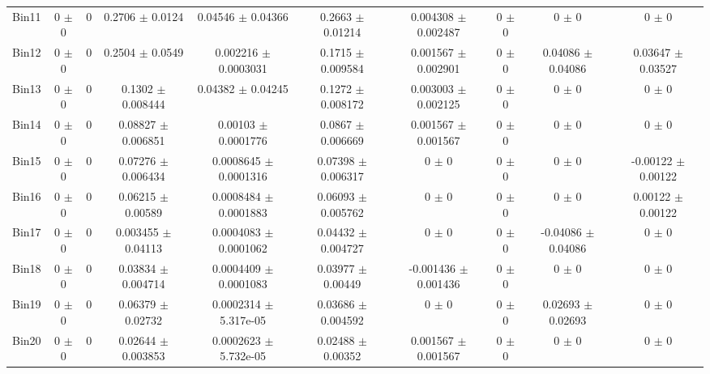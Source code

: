 \begin{tabular}{@{\extracolsep{4pt}}lccccccccc@{}}
     Bin11 & 0 $\pm$ 0 & 0 & 0.2706 $\pm$ 0.0124 & 0.04546 $\pm$ 0.04366 & 0.2663 $\pm$ 0.01214 & 0.004308 $\pm$ 0.002487 & 0 $\pm$ 0 & 0 $\pm$ 0 & 0 $\pm$ 0 \\ 
     Bin12 & 0 $\pm$ 0 & 0 & 0.2504 $\pm$ 0.0549 & 0.002216 $\pm$ 0.0003031 & 0.1715 $\pm$ 0.009584 & 0.001567 $\pm$ 0.002901 & 0 $\pm$ 0 & 0.04086 $\pm$ 0.04086 & 0.03647 $\pm$ 0.03527 \\ 
     Bin13 & 0 $\pm$ 0 & 0 & 0.1302 $\pm$ 0.008444 & 0.04382 $\pm$ 0.04245 & 0.1272 $\pm$ 0.008172 & 0.003003 $\pm$ 0.002125 & 0 $\pm$ 0 & 0 $\pm$ 0 & 0 $\pm$ 0 \\ 
     Bin14 & 0 $\pm$ 0 & 0 & 0.08827 $\pm$ 0.006851 & 0.00103 $\pm$ 0.0001776 & 0.0867 $\pm$ 0.006669 & 0.001567 $\pm$ 0.001567 & 0 $\pm$ 0 & 0 $\pm$ 0 & 0 $\pm$ 0 \\ 
     Bin15 & 0 $\pm$ 0 & 0 & 0.07276 $\pm$ 0.006434 & 0.0008645 $\pm$ 0.0001316 & 0.07398 $\pm$ 0.006317 & 0 $\pm$ 0 & 0 $\pm$ 0 & 0 $\pm$ 0 & -0.00122 $\pm$ 0.00122 \\ 
     Bin16 & 0 $\pm$ 0 & 0 & 0.06215 $\pm$ 0.00589 & 0.0008484 $\pm$ 0.0001883 & 0.06093 $\pm$ 0.005762 & 0 $\pm$ 0 & 0 $\pm$ 0 & 0 $\pm$ 0 & 0.00122 $\pm$ 0.00122 \\ 
     Bin17 & 0 $\pm$ 0 & 0 & 0.003455 $\pm$ 0.04113 & 0.0004083 $\pm$ 0.0001062 & 0.04432 $\pm$ 0.004727 & 0 $\pm$ 0 & 0 $\pm$ 0 & -0.04086 $\pm$ 0.04086 & 0 $\pm$ 0 \\ 
     Bin18 & 0 $\pm$ 0 & 0 & 0.03834 $\pm$ 0.004714 & 0.0004409 $\pm$ 0.0001083 & 0.03977 $\pm$ 0.00449 & -0.001436 $\pm$ 0.001436 & 0 $\pm$ 0 & 0 $\pm$ 0 & 0 $\pm$ 0 \\ 
     Bin19 & 0 $\pm$ 0 & 0 & 0.06379 $\pm$ 0.02732 & 0.0002314 $\pm$ 5.317e-05 & 0.03686 $\pm$ 0.004592 & 0 $\pm$ 0 & 0 $\pm$ 0 & 0.02693 $\pm$ 0.02693 & 0 $\pm$ 0 \\ 
     Bin20 & 0 $\pm$ 0 & 0 & 0.02644 $\pm$ 0.003853 & 0.0002623 $\pm$ 5.732e-05 & 0.02488 $\pm$ 0.00352 & 0.001567 $\pm$ 0.001567 & 0 $\pm$ 0 & 0 $\pm$ 0 & 0 $\pm$ 0 \\ 
\hline\hline
  \end{tabular}
